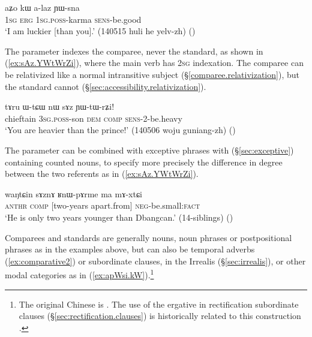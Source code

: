 \begin{exe}
\ex \label{ex:aZo.kW.alaz}
\gll aʑo kɯ a-laz ɲɯ-sna  \\
\textsc{1sg} \textsc{erg} \textsc{1sg}.\textsc{poss}-karma \textsc{sens}-be.good \\
\glt `I am luckier [than you].' (140515 huli he yelv-zh)
()
\end{exe}


The parameter indexes the comparee, never the standard, as shown in (\ref{ex:sAz.YWtWrZi}), where the main verb has \textsc{2sg} indexation. The comparee can be relativized like a normal intransitive subject (§\ref{comparee.relativization}), but the standard cannot (§\ref{sec:accessibility.relativization}).

\begin{exe}
\ex \label{ex:sAz.YWtWrZi}
\gll tɤru ɯ-tɕɯ nɯ sɤz ɲɯ-tɯ-rʑi! \\
chieftain \textsc{3sg}.\textsc{poss}-son \textsc{dem} \textsc{comp} \textsc{sens}-2-be.heavy \\
\glt `You are heavier than the prince!' (140506 woju guniang-zh)
()
\end{exe}

The parameter can be combined with exceptive phrases
with  (§\ref{sec:exceptive}) containing counted nouns, to specify more precisely the difference in degree between the two referents as in (\ref{ex:sAz.YWtWrZi}).

\begin{exe}
\ex \label{ex:RWpArme.ma.mAxtCi}
\gll waŋtɕin sɤznɤ ʁnɯ-pɤrme ma mɤ-xtɕi \\
\textsc{anthr} \textsc{comp} [two-years apart.from] \textsc{neg}-be.small:\textsc{fact} \\
\glt `He is only two years younger than Dbangcan.' (14-siblings)
()
\end{exe}
 
Comparees and standards are generally nouns, noun phrases or postpositional phrases as in the examples above, but can also be temporal adverbs (\ref{ex:comparative2}) or subordinate clauses, in the Irrealis (§\ref{sec:irrealis}), or other modal categories as in (\ref{ex:apWsi.kW}).\footnote{The original Chinese is . The use of the ergative in rectification subordinate clauses (§\ref{sec:rectification.clauses}) is historically related to this construction \citep{jacques16comparative}. }
  
